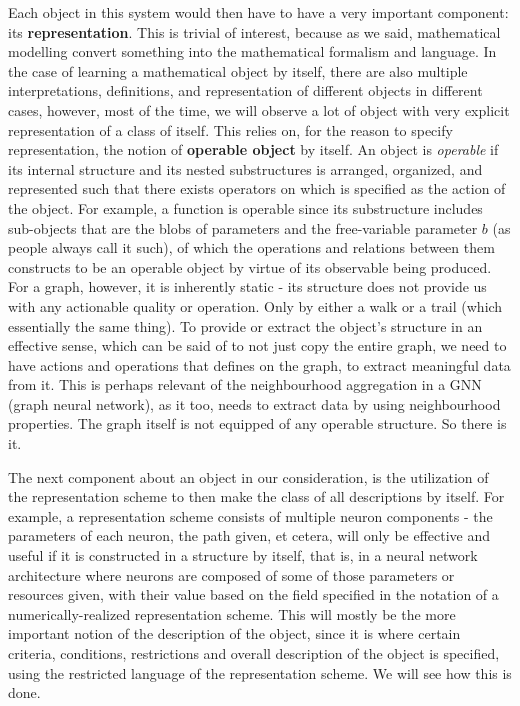 \documentclass[10pt]{article}
\begin{document}
Each object in this system would then have to have a very important component: its \textbf{representation}. This is trivial of interest, because as we said, mathematical modelling convert something into the mathematical formalism and language. In the case of learning a mathematical object by itself, there are also multiple interpretations, definitions, and representation of different objects in different cases, however, most of the time, we will observe a lot of object with very explicit representation of a class of itself. This relies on, for the reason to specify representation, the notion of \textbf{operable object} by itself. An object is \textit{operable} if its internal structure and its nested substructures is arranged, organized, and represented such that there exists operators on which is specified as the action of the object. For example, a function is operable since its substructure includes sub-objects that are the blobs of parameters and the free-variable parameter $b$ (as people always call it such), of which the operations and relations between them constructs to be an operable object by virtue of its observable being produced. For a graph, however, it is inherently static - its structure does not provide us with any actionable quality or operation. Only by either a walk or a trail (which essentially the same thing). To provide or extract the object's structure in an effective sense, which can be said of to not just copy the entire graph, we need to have actions and operations that defines on the graph, to extract meaningful data from it. This is perhaps relevant of the neighbourhood aggregation in a GNN (graph neural network), as it too, needs to extract data by using neighbourhood properties. The graph itself is not equipped of any operable structure. So there is it. 

The next component about an object in our consideration, is the utilization of the representation scheme to then make the class of all descriptions by itself. For example, a representation scheme consists of multiple neuron components - the parameters of each neuron, the path given, et cetera, will only be effective and useful if it is constructed in a structure by itself, that is, in a neural network architecture where neurons are composed of some of those parameters or resources given, with their value based on the field specified in the notation of a numerically-realized representation scheme. This will mostly be the more important notion of the description of the object, since it is where certain criteria, conditions, restrictions and overall description of the object is specified, using the restricted language of the representation scheme. We will see how this is done. 
\end{document}

